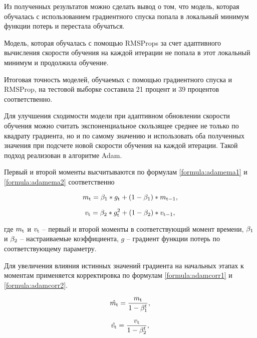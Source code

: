 Из полученных результатов можно сделать вывод о том, что модель, которая обучалась с использованием градиентного спуска попала в локальный минимум функции потерь и перестала обучаться. 

Модель, которая обучалась с помощью RMSProps за счет адаптивного вычисления скорости обучения на каждой итерации не попала в этот локальный минимум и продолжила обучение.

Итоговая точность моделей, обучаемых с помощью градиентного спуска и RMSProp, на тестовой выборке составила 21 процент и 39 процентов соответственно.

Для улучшения сходимости модели при адаптивном обновлении скорости обучения можно считать экспоненциальное скользящее среднее не только по квадрату градиента, но и по самому значению и использовать оба полученных значения при подсчете новой скорости обучения на каждой итерации. Такой подход реализован в алгоритме Adam.

Первый и второй моменты высчитываются по формулам \ref{formula:adamema1} и \ref{formula:adamema2} соответственно

\begin{equation}\label{formula:adamema1}
m_{\rm{t}} = \beta_{\rm{1}} * g_{\rm{t}} + (1 - \beta_{\rm{1}}) * m_{\rm{t-1}},
\end{equation}

\begin{equation}\label{formula:adamema2}
v_{\rm{t}} = \beta_{\rm{2}} * g_{\rm{t}}^2 + (1 - \beta_{\rm{2}}) * v_{\rm{t-1}},
\end{equation}

где $m_{\rm{t}}$ и $v_{\rm{t}}$ -- первый и второй моменты в соответствующий момент времени, $\beta_{\rm{1}}$ и $\beta_{\rm{2}}$ -- настраиваемые коэффициента, $g$ -- градиент функции потерь по соответствующему параметру.

Для увеличения влияния истинных значений градиента на начальных этапах к моментам применяется корректировка по формулам \ref{formula:adamcorr1} и \ref{formula:adamcorr2}.

\begin{equation}\label{formula:adamcorr1}
\hat{m_{\rm{t}}} = \frac{m_{\rm{t}}}{1 - \beta_{\rm{1}}^t},
\end{equation}

\begin{equation}\label{formula:adamcorr2}
\hat{v_{\rm{t}}} = \frac{v_{\rm{t}}}{1 - \beta_{\rm{2}}^t},
\end{equation}

